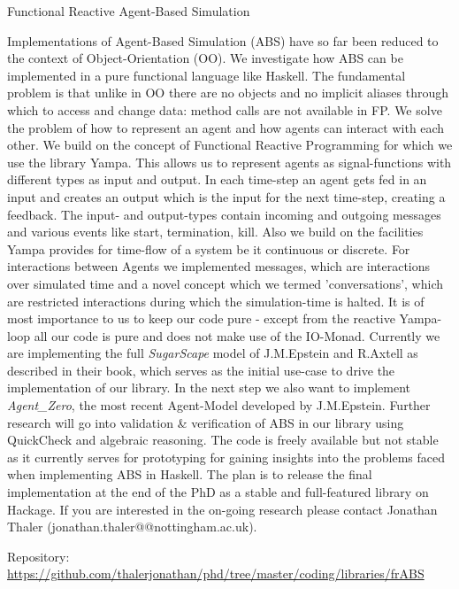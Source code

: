 \begin{hcarentry}[new]{Functional Reactive Agent-Based Simulation}
\makeheader

Implementations of Agent-Based Simulation (ABS) have so far been reduced to
the context of Object-Orientation (OO). We investigate how ABS can be
implemented in a pure functional language like Haskell. The fundamental
problem is that unlike in OO there are no objects and no implicit aliases
through which to access and change data: method calls are not available in FP.
We solve the problem of how to represent an agent and how agents can interact
with each other. We build on the concept of Functional Reactive Programming
for which we use the library Yampa. This allows us to represent agents as
signal-functions with different types as input and output. In each time-step
an agent gets fed in an input and creates an output which is the input for the
next time-step, creating a feedback. The input- and output-types contain
incoming and outgoing messages and various events like start, termination,
kill. Also we build on the facilities Yampa provides for time-flow of a system
be it continuous or discrete. For interactions between Agents we implemented
messages, which are interactions over simulated time and a novel concept which
we termed 'conversations', which are restricted interactions during which the
simulation-time is halted. It is of most importance to us to keep our code
pure - except from the reactive Yampa-loop all our code is pure and does not
make use of the IO-Monad. Currently we are implementing the full
\textit{SugarScape} model of J.M.Epstein and R.Axtell as described in their
book, which serves as the initial use-case to drive the implementation of our
library. In the next step we also want to implement \textit{Agent\_Zero}, the
most recent Agent-Model developed by J.M.Epstein. Further research will go
into validation \& verification of ABS in our library using QuickCheck and
algebraic reasoning. The code is freely available but not stable as it
currently serves for prototyping for gaining insights into the problems faced
when implementing ABS in Haskell. The plan is to release the final
implementation at the end of the PhD as a stable and full-featured library on
Hackage. If you are interested in the on-going research please contact
Jonathan Thaler (jonathan.thaler@@nottingham.ac.uk).

\FurtherReading
  Repository: \url{https://github.com/thalerjonathan/phd/tree/master/coding/libraries/frABS}
\end{hcarentry}
